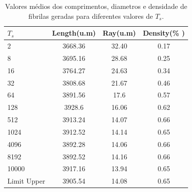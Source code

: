 \documentclass{article}
\begin{document}
    \begin{table}[H]
        \caption{Valores médios dos comprimentos, diametros e densidade de fibrilas geradas para diferentes valores de \(T_{s}\).}

        \centering  %
        \begin{tabular}{lccc}
        \hline
        \textbf{$T_{s}$} & \multicolumn{1}{c}{\textbf{Length(u.m)}} & \textbf{Ray(u.m)} & \textbf{Density(\% )} \\ \hline
        2                & 3668.36                                   & 32.40             & 0.17                  \\
        8                & 3695.16                                   & 28.68             & 0.25                  \\
        16               & 3764.27                                   & 24.63             & 0.34                  \\
        32               & 3808.68                                   & 21.67             & 0.46                  \\
        64               & 3891.56                                   & 17.6              & 0.57                  \\
        128              & 3928.6                                    & 16.06             & 0.62                  \\
        512              & 3913.24                                   & 14.07             & 0.66                  \\
        1024             & 3912.52                                   & 14.14             & 0.65                  \\
        4096             & 3892.28                                   & 14.06             & 0.66                  \\
        8192             & 3892.52                                   & 14.16             & 0.66                  \\
        10000            & 3917.16                                   & 13.94             & 0.65                  \\ \hline
        \multicolumn{1}{l}{Limit Upper} & 3905.54                    & 14.08             & 0.65                  \\ \hline
        \end{tabular}
        \label{tab1}  %
    \end{table}
\end{document}
